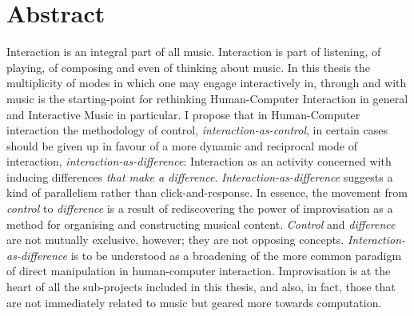 \section*{Abstract}
\label{cha:abstract}
\pagestyle{plain}

Interaction is an integral part of all music. Interaction is part of listening, of playing, of composing and even of thinking about music. In this thesis the multiplicity of modes in which one may engage interactively in, through and with music is the starting-point for rethinking Human-Computer Interaction in general and Interactive Music in particular. I propose that in Human-Computer interaction the methodology of control, \emph{interaction-as-control}, in certain cases should be given up in favour of a more dynamic and reciprocal mode of interaction, \emph{interaction-as-difference}: Interaction as an activity concerned with inducing differences \emph{that make a difference}. \emph{Interaction-as-difference} suggests a kind of parallelism rather than click-and-response. In essence, the movement from \emph{control} to \emph{difference} is a result of rediscovering the power of improvisation as a method for organising and constructing musical content. \emph{Control} and \emph{difference} are not mutually exclusive, however; they are not opposing concepts. \emph{Interaction-as-difference} is to be understood as a broadening of the more common paradigm of direct manipulation in human-computer interaction. Improvisation is at the heart of all the sub-projects included in this thesis, and also, in fact, those that are not immediately related to music but geared more towards computation. 

